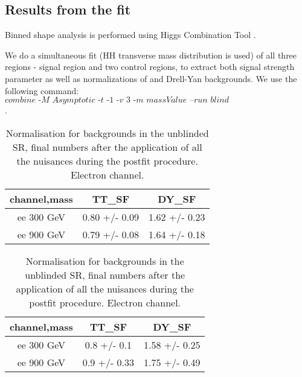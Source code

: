  
\subsection{Results from the fit}
Binned shape analysis is performed using Higgs Combination Tool  \cite{HiggsCombine}.  

We do a simultaneous fit (HH transverse mass distribution is used) of all three
regions - signal region and two control regions, to extract both
signal strength parameter as well as normalizations of \ttbar and
Drell-Yan backgrounds.  We use the following command:  \hfill \break
$\textit{combine 
-M Asymptotic -t -1 -v 3 -m massValue --run blind
comb\_card\_massValue.txt}$.


\begin{table}
\begin{center}
\caption{Normalization for backgrounds, final numbers after the application of all the nuisances during the postfit procedure. Electron channel.}
\begin{tabular}{ | c | c | c | }
  \hline
  channel,mass & TT\_SF & DY\_SF \\
  \hline
  ee 300 GeV    & 0.80 +/- 0.09   &  1.62 +/- 0.23\\
  ee 900 GeV    & 0.79 +/- 0.08    & 1.64 +/- 0.18\\
  \hline
\end{tabular}
\label{normalization_electron}
\end{center}
\begin{center}
\caption{Normalisation for backgrounds in the unblinded SR, final numbers after the application of all the nuisances during the postfit procedure. Electron channel.}
\begin{tabular}{ | c | c | c | }
  \hline
  channel,mass & TT\_SF & DY\_SF \\
  \hline
  ee 300 GeV    &  0.8 +/- 0.1    &   1.58 +/- 0.25 \\
 ee 900 GeV    &  0.9 +/- 0.33     &  1.75 +/- 0.49\\
  \hline
\end{tabular}
\label{normalization_electron_SR}
\end{center}
\end{table}


